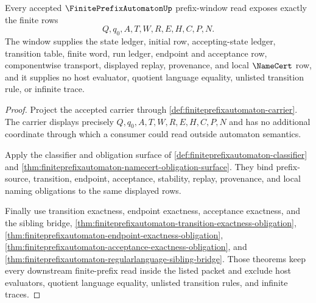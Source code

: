 \begin{theorem}
\label{thm:finite-prefix-automaton-obligation-window}
Every accepted $\FinitePrefixAutomatonUp$ prefix-window read exposes exactly the finite rows
$$
Q,q_0,A,T,W,R,E,H,C,P,N .
$$
The window supplies the state ledger, initial row, accepting-state ledger, transition table, finite word, run ledger, endpoint and acceptance row, componentwise transport, displayed replay, provenance, and local $\NameCert$ row, and it supplies no host evaluator, quotient language equality, unlisted transition rule, or infinite trace.
\end{theorem}
\begin{proof}
Project the accepted carrier through \autoref{def:finiteprefixautomaton-carrier}. The carrier displays precisely $Q,q_0,A,T,W,R,E,H,C,P,N$ and has no additional coordinate through which a consumer could read outside automaton semantics.

Apply the classifier and obligation surface of \autoref{def:finiteprefixautomaton-classifier} and \autoref{thm:finiteprefixautomaton-namecert-obligation-surface}. They bind prefix-source, transition, endpoint, acceptance, stability, replay, provenance, and local naming obligations to the same displayed rows.

Finally use transition exactness, endpoint exactness, acceptance exactness, and the sibling bridge, \autoref{thm:finiteprefixautomaton-transition-exactness-obligation}, \autoref{thm:finiteprefixautomaton-endpoint-exactness-obligation}, \autoref{thm:finiteprefixautomaton-acceptance-exactness-obligation}, and \autoref{thm:finiteprefixautomaton-regularlanguage-sibling-bridge}. Those theorems keep every downstream finite-prefix read inside the listed packet and exclude host evaluators, quotient language equality, unlisted transition rules, and infinite traces.
\end{proof}

